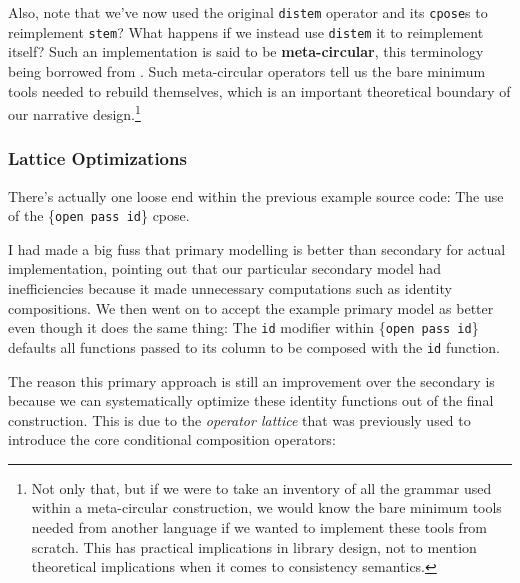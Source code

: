 \documentclass[twoside]{article}
\newcommand{\strong}[1]{{\bfseries #1}}
\newcommand{\tpose}[2]{\raisebox{#1}{\ensuremath{\star}}\{\texttt{#2}\}}
\newcommand{\deftpose}[1]{\tpose{0.1ex}{#1}}
\begin{document}
Also, note that we've now used the original \texttt{distem} operator and its \texttt{cpose}s to reimplement
\texttt{stem}? What happens if we instead use \texttt{distem} it to reimplement itself? Such an implementation
is said to be \strong{meta-circular}, this terminology being borrowed from \cite{sicp}. Such meta-circular
operators tell us the bare minimum tools needed to rebuild themselves, which is an important theoretical
boundary of our narrative design.\footnote{Not only that, but if we were to take an inventory of all the grammar
used within a meta-circular construction, we would know the bare minimum tools needed from another language
if we wanted to implement these tools from scratch. This has practical implications in library design,
not to mention theoretical implications when it comes to consistency semantics.}

\subsubsection*{Lattice Optimizations}

There's actually one loose end within the previous example source code: The use of the \deftpose{open pass id} cpose.

I had made a big fuss that primary modelling is better than secondary for actual implementation, pointing out that
our particular secondary model had inefficiencies because it made unnecessary computations such as identity compositions.
We then went on to accept the example primary model as better even though it does the same thing: The \texttt{id} modifier
within \deftpose{open pass id} defaults all functions passed to its column to be composed with the \texttt{id} function.

The reason this primary approach is still an improvement over the secondary is because we can systematically
optimize these identity functions out of the final construction. This is due to the \emph{operator lattice}
that was previously used to introduce the core conditional composition operators:
\end{document}
